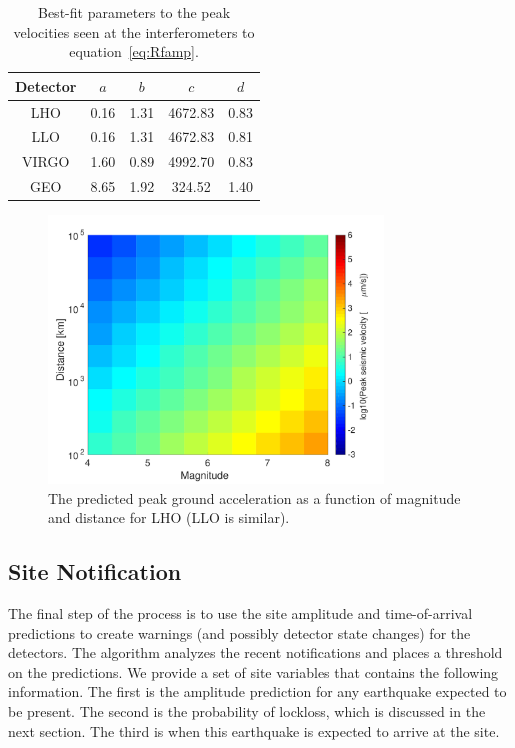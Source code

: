 \documentclass[reprint, prl, aps, showpacs]{revtex4-1}
\begin{document}
\begin{table}[]
\centering
\begin{tabular}{|c|c|c|c|c|}
\hline
Detector & $a$ & $b$ & $c$ & $d$ \\ \hline
LHO & 0.16 & 1.31 & 4672.83 & 0.83 \\ \hline
LLO & 0.16 & 1.31 & 4672.83 & 0.81 \\ \hline
VIRGO & 1.60 & 0.89 & 4992.70 & 0.83 \\ \hline
GEO & 8.65 & 1.92 & 324.52 & 1.40 \\ \hline
\end{tabular}
\caption{Best-fit parameters to the peak velocities seen at the interferometers to equation~\ref{eq:Rfamp}.}
\label{table:fit}
\end{table}

\begin{figure}[t]
\hspace*{-0.5cm}
 \includegraphics[width=3.5in]{LHO_M_r.pdf}
 \caption{The predicted peak ground acceleration as a function of magnitude and distance for LHO (LLO is similar).}
 \label{fig:MvsR}
\end{figure}

\subsection{Site Notification}
The final step of the process is to use the site amplitude and time-of-arrival predictions to create warnings (and possibly detector state changes) for the detectors. The algorithm analyzes the recent notifications and places a threshold on the predictions. We provide a set of site variables that contains the following information. The first is the amplitude prediction for any earthquake expected to be present.
The second is the probability of lockloss, which is discussed in the next section. The third is when this earthquake is expected to arrive at the site.
		
\end{document}

